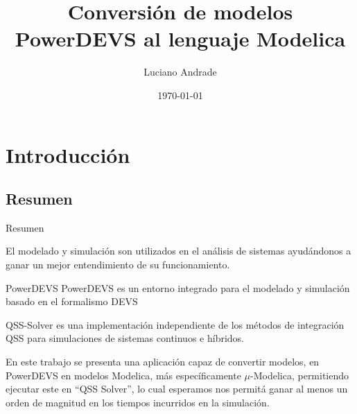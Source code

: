 \documentclass[10pt,handout]{beamer}
\title{Conversión de modelos PowerDEVS al lenguaje Modelica}
\author{Luciano Andrade}
\institute[UNR] 
{
Universidad Nacional de Rosario\\
\medskip
\textit{andrade.luciano@gmail.com}
}
\date{\today}
\newcommand{\quotes}[1]{``#1''}
\begin{document}
\begin{frame}
\titlepage %
\end{frame}

\section{Introducción}
	\subsection{Resumen}
\begin{frame}{Resumen}
\begin{block}{El modelado y simulación}
son utilizados en el análisis de sistemas  ayudándonos a ganar un mejor entendimiento de su funcionamiento. 
\end{block}

\begin{block}{PowerDEVS}
PowerDEVS es un entorno integrado para el modelado y simulación basado en el formalismo DEVS
\end{block}

\begin{block}{QSS-Solver}
es una implementación independiente de los métodos de integración QSS para simulaciones de sistemas continuos e híbridos. 
\end{block}


\begin{block}{En este trabajo}
se presenta una aplicación capaz de convertir modelos, en PowerDEVS en modelos Modelica, más específicamente $\mu$-Modelica, permitiendo ejecutar este en \quotes{QSS Solver}, lo cual esperamos nos permitá ganar al menos un orden de magnitud en los tiempos incurridos en la simulación.
\end{block}
\end{frame}
\end{document}
